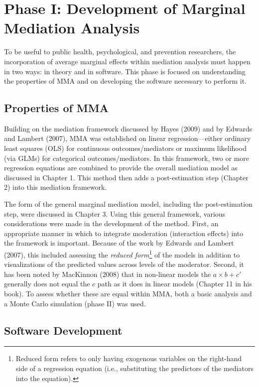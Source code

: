 \documentclass[]{DissertateUSU}
\let\rmarkdownfootnote\footnote%
\def\footnote{\protect\rmarkdownfootnote}
\begin{document}
\section{Phase I: Development of Marginal Mediation
Analysis}\label{phase-i-development-of-marginal-mediation-analysis}

To be useful to public health, psychological, and prevention
researchers, the incorporation of average marginal effects within
mediation analysis must happen in two ways: in theory and in software.
This phase is focused on understanding the properties of MMA and on
developing the software necessary to perform it.

\subsection{Properties of MMA}\label{properties-of-mma}

Building on the mediation framework discussed by Hayes (2009) and by
Edwards and Lambert (2007), MMA was established on linear
regression---either ordinary least squares (OLS) for continuous
outcomes/mediators or maximum likelihood (via GLMs) for categorical
outcomes/mediators. In this framework, two or more regression equations
are combined to provide the overall mediation model as discussed in
Chapter 1. This method then adds a post-estimation step (Chapter 2) into
this mediation framework.

The form of the general marginal mediation model, including the
post-estimation step, were discussed in Chapter 3. Using this general
framework, various considerations were made in the development of the
method. First, an appropriate manner in which to integrate moderation
(interaction effects) into the framework is important. Because of the
work by Edwards and Lambert (2007), this included assessing the
\emph{reduced
form}\footnote{Reduced form refers to only having exogenous variables on the right-hand side of a regression equation (i.e., substituting the predictors of the mediators into the equation).}
of the models in addition to visualizations of the predicted values
across levels of the moderator. Second, it has been noted by MacKinnon
(2008) that in non-linear models the \(a \times b + c'\) generally does
not equal the \(c\) path as it does in linear models (Chapter 11 in his
book). To assess whether these are equal within MMA, both a basic
analysis and a Monte Carlo simulation (phase II) was used.

\subsection{Software Development}\label{software-development}
\end{document}
